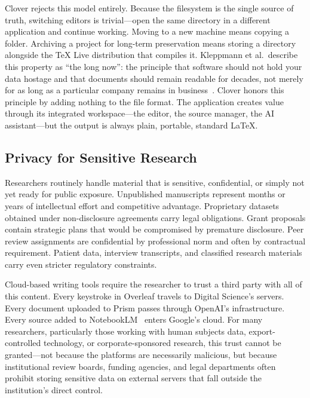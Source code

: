 \documentclass[a4paper,11pt]{article}
\begin{document}
Clover rejects this model entirely. Because the filesystem is the single source of truth, switching editors is trivial---open the same directory in a different application and continue working. Moving to a new machine means copying a folder. Archiving a project for long-term preservation means storing a directory alongside the TeX Live distribution that compiles it. Kleppmann et al.\ describe this property as ``the long now'': the principle that software should not hold your data hostage and that documents should remain readable for decades, not merely for as long as a particular company remains in business~\cite{Kleppmann2019LocalFirst}. Clover honors this principle by adding nothing to the file format. The application creates value through its integrated workspace---the editor, the source manager, the AI assistant---but the output is always plain, portable, standard \LaTeX{}.

\subsection{Privacy for Sensitive Research}

Researchers routinely handle material that is sensitive, confidential, or simply not yet ready for public exposure. Unpublished manuscripts represent months or years of intellectual effort and competitive advantage. Proprietary datasets obtained under non-disclosure agreements carry legal obligations. Grant proposals contain strategic plans that would be compromised by premature disclosure. Peer review assignments are confidential by professional norm and often by contractual requirement. Patient data, interview transcripts, and classified research materials carry even stricter regulatory constraints.

Cloud-based writing tools require the researcher to trust a third party with all of this content. Every keystroke in Overleaf travels to Digital Science's servers. Every document uploaded to Prism passes through OpenAI's infrastructure. Every source added to NotebookLM~\cite{NotebookLM} enters Google's cloud. For many researchers, particularly those working with human subjects data, export-controlled technology, or corporate-sponsored research, this trust cannot be granted---not because the platforms are necessarily malicious, but because institutional review boards, funding agencies, and legal departments often prohibit storing sensitive data on external servers that fall outside the institution's direct control.
\end{document}
